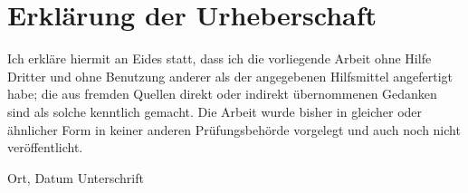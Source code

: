 \chapter*{Erkl{\"a}rung der Urheberschaft}
Ich erkl\"are hiermit an Eides statt, 
dass ich die vorliegende Arbeit ohne Hilfe Dritter 
und ohne Benutzung anderer als der angegebenen Hilfsmittel angefertigt habe; 
die aus fremden Quellen direkt 
oder indirekt \"ubernommenen Gedanken sind als solche kenntlich gemacht. 
Die Arbeit wurde bisher in gleicher oder \"ahnlicher Form 
in keiner anderen Pr\"ufungsbeh\"orde vorgelegt 
und auch noch nicht ver\"offentlicht.


\vspace{4cm}

Ort, Datum \hfill Unterschrift

\newpage
